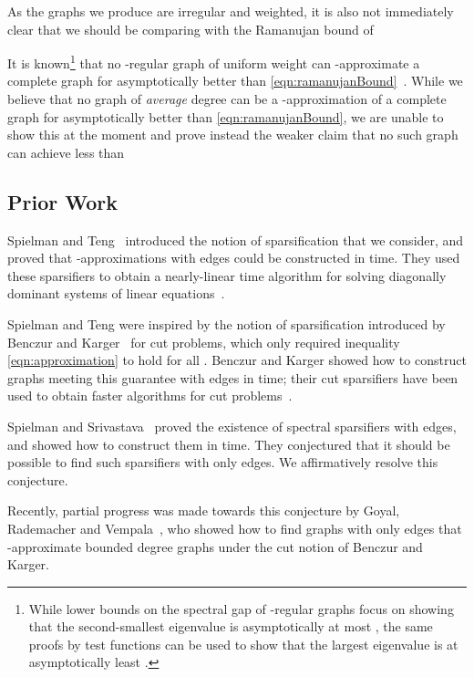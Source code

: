 \documentclass[12pt]{article}
\begin{document}
As the graphs we produce are irregular and weighted, it is also not immediately
  clear that we should be comparing  with the Ramanujan bound of

It is known\footnote{While lower bounds on the spectral gap of -regular graphs
  focus on showing that the second-smallest eigenvalue is asymptotically
  at most
  , the same proofs by test functions
  can be used to show that the
  largest eigenvalue is at asymptotically least .}
 that no -regular graph of uniform weight
  can -approximate a complete graph for  
  asymptotically better than 
  \eqref{eqn:ramanujanBound}~\cite{Nilli}.
While we believe that no graph of {\em average} degree  can be a
  -approximation of a complete graph for  asymptotically
  better than \eqref{eqn:ramanujanBound}, we are unable to show this at the
  moment and prove
  instead the weaker claim that no such graph can achieve  
  less than



\subsection{Prior Work}\label{sec:prior}
Spielman and Teng~\cite{SpielmanTengPrecon,SpielmanTengSparsifier} 
  introduced the notion of
  sparsification that we consider, and proved that -approxim\-ations
  with  edges could be constructed in  time.
They used these sparsifiers to obtain a nearly-linear time algorithm
  for solving diagonally dominant systems of linear 
  equations~\cite{SpielmanTengPrecon,SpielmanTengLinsolve}.

Spielman and Teng were inspired by the notion of sparsification introduced by Benczur
  and Karger~\cite{BenczurKarger} for cut problems, which only
  required 
  inequality \eqref{eqn:approximation} to hold for all .
Benczur and Karger showed how to construct graphs  meeting this guarantee
  with   edges in  time;
 their cut sparsifiers have been used to obtain faster algorithms
  for cut problems~\cite{BenczurKarger,krv}.


Spielman and Srivastava~\cite{SpielmanSrivastava} proved the
  existence of spectral sparsifiers with 
  edges, and showed how to construct them in  time.
They conjectured that it should be possible to find such sparsifiers with only
   edges.
We affirmatively resolve this conjecture.

Recently, partial progress was made towards this conjecture
  by Goyal, Rademacher and Vempala~\cite{GoyalRademacherVempala},
  who showed how to find graphs  with only  edges that 
  -approximate bounded degree graphs
   under the cut notion of Benczur and Karger.
\end{document}
